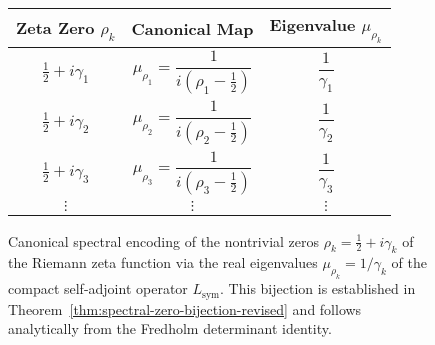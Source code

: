 \begin{figure}[ht]
\centering
\renewcommand{\arraystretch}{1.25}
\begin{tabular}{c|c|c}
\toprule
\textbf{Zeta Zero \( \rho_k \)} & \textbf{Canonical Map} & \textbf{Eigenvalue \( \mu_{\rho_k} \)} \\
\midrule
\( \tfrac{1}{2} + i\gamma_1 \) & \( \mu_{\rho_1} = \dfrac{1}{i(\rho_1 - \tfrac{1}{2})} \) & \( \dfrac{1}{\gamma_1} \) \\
\( \tfrac{1}{2} + i\gamma_2 \) & \( \mu_{\rho_2} = \dfrac{1}{i(\rho_2 - \tfrac{1}{2})} \) & \( \dfrac{1}{\gamma_2} \) \\
\( \tfrac{1}{2} + i\gamma_3 \) & \( \mu_{\rho_3} = \dfrac{1}{i(\rho_3 - \tfrac{1}{2})} \) & \( \dfrac{1}{\gamma_3} \) \\
\( \vdots \) & \( \vdots \) & \( \vdots \) \\
\bottomrule
\end{tabular}
\caption{
Canonical spectral encoding of the nontrivial zeros \( \rho_k = \tfrac{1}{2} + i\gamma_k \) of the Riemann zeta function via the real eigenvalues \( \mu_{\rho_k} = 1/\gamma_k \) of the compact self-adjoint operator \( L_{\mathrm{sym}} \). This bijection is established in Theorem~\ref{thm:spectral-zero-bijection-revised} and follows analytically from the Fredholm determinant identity.
}
\label{fig:spectral-bijection-table}
\end{figure}
%  